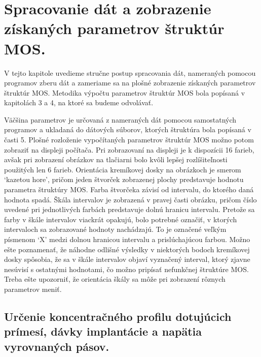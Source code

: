 
\chapter{Spracovanie dát a zobrazenie získaných parametrov štruktúr MOS.}%
\label{Chapter6} %

V tejto kapitole uvedieme stručne postup spracovania dát, nameraných
pomocou programov zberu dát a zameriame sa na plošné zobrazenie
získaných parametrov štruktúr MOS\@. Metodika výpočtu parametrov
štruktúr MOS bola popísaná v kapitolách 3 a 4, na ktoré sa budeme
odvolávať.

Väčšina parametrov je určovaná z nameraných dát pomocou samostatných
programov a ukladaná do dátových súborov, ktorých štruktúra bola
popísaná v časti 5. Plošné rozloženie vypočítaných parametrov štruktúr
MOS možno potom zobraziť na displeji počítača. Pri zobrazovaní na
displeji je k dispozícii 16 farieb, avšak pri zobrazení obrázkov na
tlačiarni bolo kvôli lepšej rozlíšiteľnosti použitých len 6
farieb. Orientácia kremíkovej dosky na obrázkoch je smerom `kazetou
hore', pričom jeden štvorček zobrazenej plochy predstavuje hodnotu
parametra štruktúry MOS\@. Farba štvorčeka závisí od intervalu, do
ktorého daná hodnota spadá. Škála intervalov je zobrazená v pravej
časti obrázku, pričom číslo uvedené pri jednotlivých farbách
predstavuje dolnú hranicu intervalu. Pretože sa farby v škále
intervalov viackrát opakujú, bolo potrebné označiť, v ktorých
intervaloch sa zobrazované hodnoty nachádzajú. To je označené veľkým
písmenom `X' medzi dolnou hranicou intervalu a prislúchajúcou
farbou. Možno ešte poznamenať, že náhodne odlišné výsledky v
niektorých bodoch kremíkovej dosky spôsobia, že sa v škále intervalov
objaví vyznačený interval, ktorý zjavne nesúvisí s ostatnými
hodnotami, čo možno pripísať nefunkčnej štruktúre MOS\@. Treba ešte
upozorniť, že orientácia škály sa môže pri zobrazení rôznych
parametrov meniť.

\section{Určenie koncentračného profilu dotujúcich prímesí, dávky implantácie a napätia vyrovnaných pásov.}\label{sec:6.1}

